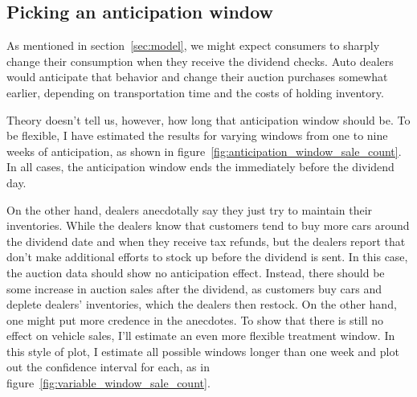 \documentclass[11pt,letterpaper,oneside]{article}
\newcommand{\snippet}[1]{\hspace{-0.15em}}
\begin{document}
\begin{doublespacing}
\subsection{Picking an anticipation window}

As mentioned in section~\ref{sec:model}, we might expect consumers to sharply change their consumption when they receive the dividend checks.
Auto dealers would anticipate that behavior and change their auction purchases somewhat earlier, depending on transportation time and the costs of holding inventory.

Theory doesn't tell us, however, how long that anticipation window should be.
To be flexible, I have estimated the results for varying windows from one to nine weeks of anticipation, as shown in figure~\ref{fig:anticipation_window_sale_count}.
In all cases, the anticipation window ends the immediately before the dividend day.

On the other hand, dealers anecdotally say they just try to maintain their inventories.
While the dealers know that customers tend to  buy more cars around the dividend date and when they receive tax refunds, but the dealers report that don't make additional efforts to stock up before the dividend is sent.
In this case, the auction data should show no anticipation effect.
Instead, there should be some increase in auction sales after the dividend, as customers buy cars and deplete dealers' inventories, which the dealers then restock.
On the other hand, one might put more credence in the anecdotes.
To show that there is still no effect on vehicle sales, I'll estimate an even more flexible treatment window.
In this style of plot, I estimate all possible windows longer than one week and plot out the confidence interval for each, as in figure~\ref{fig:variable_window_sale_count}.




%



\end{doublespacing}
\end{document}
